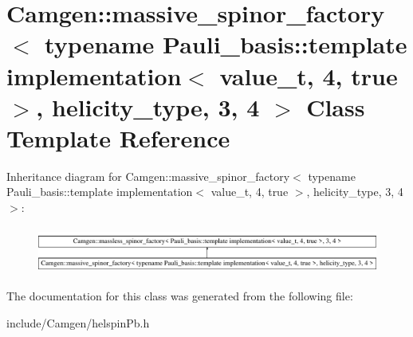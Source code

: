\hypertarget{a00345}{\section{Camgen\-:\-:massive\-\_\-spinor\-\_\-factory$<$ typename Pauli\-\_\-basis\-:\-:template implementation$<$ value\-\_\-t, 4, true $>$, helicity\-\_\-type, 3, 4 $>$ Class Template Reference}
\label{a00345}
}
Inheritance diagram for Camgen\-:\-:massive\-\_\-spinor\-\_\-factory$<$ typename Pauli\-\_\-basis\-:\-:template implementation$<$ value\-\_\-t, 4, true $>$, helicity\-\_\-type, 3, 4 $>$\-:\begin{figure}[H]
\begin{center}
\leavevmode
\includegraphics[height=1.564246cm]{a00345}
\end{center}
\end{figure}


The documentation for this class was generated from the following file\-:\begin{DoxyCompactItemize}
\item 
include/\-Camgen/helspin\-Pb.\-h\end{DoxyCompactItemize}
